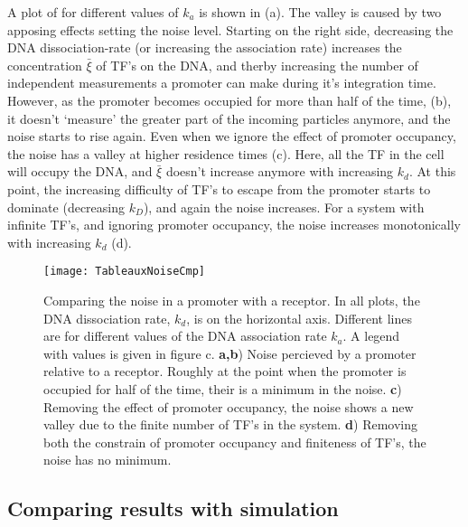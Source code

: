 A plot of  for different values of $k_a$ is shown in  (a). The valley is caused by two apposing effects setting the noise level. Starting on the right side, decreasing the DNA dissociation-rate (or increasing the association rate) increases the concentration $\bar{\xi}$ of TF's on the DNA, and therby increasing the number of independent measurements a promoter can make during it's integration time. However, as the promoter becomes occupied for more than half of the time,  (b), it doesn't `measure' the greater part of the incoming particles anymore, and the noise starts to rise again. Even when we ignore the effect of promoter occupancy, the noise has a valley at higher residence times (c). Here, all the TF in the cell will occupy the DNA, and $\bar{\xi}$ doesn't increase anymore with increasing $k_d$. At this point, the increasing difficulty of TF's to escape from the promoter starts to dominate (decreasing $k_D$), and again the noise increases. For a system with infinite TF's, and ignoring promoter occupancy, the noise increases monotonically with increasing $k_d$ (d). 

\begin{figure}
\texttt{[image: TableauxNoiseCmp]}
\caption{ Comparing the noise in a promoter with a receptor. In all plots, the DNA dissociation rate, $k_d$, is on the horizontal axis. Different lines are for different values of the DNA association rate $k_a$. A legend with values is given in figure c. {\bf a,b}) Noise percieved by a promoter relative to a receptor. Roughly at the point when the promoter is occupied for half of the time, their is a minimum in the noise. {\bf c}) Removing the effect of promoter occupancy, the noise shows a new valley due to the finite number of TF's in the system. {\bf d}) Removing both the constrain of promoter occupancy and finiteness of TF's, the noise has no minimum.
}
\end{figure}



\subsection{Comparing results with simulation}

